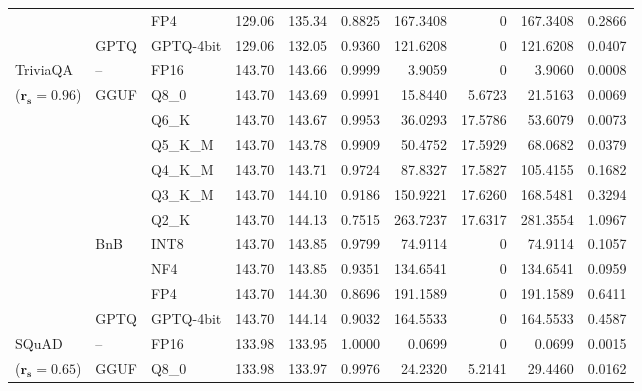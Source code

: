 \begin{longtable}{ll l rrrrrrr}
 &  & FP4 & 129.06 & 135.34 & \cellcolor{red!18} 0.8825 & \cellcolor{red!18} 167.3408 & \cellcolor{cyan!12} $0$ & \cellcolor{red!18} 167.3408 & \cellcolor{red!18} 0.2866 \\
 & GPTQ & GPTQ-4bit & 129.06 & 132.05 & \cellcolor{red!18} 0.9360 & \cellcolor{red!18} 121.6208 & \cellcolor{cyan!12} $0$ & \cellcolor{red!18} 121.6208 & \cellcolor{red!18} 0.0407 \\
\midrule
TriviaQA & -- & FP16 & 143.70 & 143.66 & 0.9999 & 3.9059 & \cellcolor{cyan!12} $0$ & 3.9060 & 0.0008 \\
{\small ($\mathbf{r_s{=}0.96}$)} & GGUF & Q8\_0 & 143.70 & 143.69 & 0.9991 & 15.8440 & 5.6723 & 21.5163 & 0.0069 \\
 &  & Q6\_K & 143.70 & 143.67 & 0.9953 & 36.0293 & 17.5786 & 53.6079 & 0.0073 \\
 &  & Q5\_K\_M & 143.70 & 143.78 & 0.9909 & 50.4752 & 17.5929 & 68.0682 & 0.0379 \\
 &  & Q4\_K\_M & 143.70 & 143.71 & 0.9724 & 87.8327 & 17.5827 & 105.4155 & 0.1682 \\
 &  & Q3\_K\_M & 143.70 & 144.10 & \cellcolor{red!18} 0.9186 & \cellcolor{red!18} 150.9221 & 17.6260 & \cellcolor{red!18} 168.5481 & \cellcolor{red!18} 0.3294 \\
 &  & Q2\_K & 143.70 & 144.13 & \cellcolor{red!35} 0.7515 & \cellcolor{red!35} 263.7237 & 17.6317 & \cellcolor{red!35} 281.3554 & \cellcolor{red!35} 1.0967 \\
 & BnB & INT8 & 143.70 & 143.85 & 0.9799 & 74.9114 & \cellcolor{cyan!12} $0$ & 74.9114 & 0.1057 \\
 &  & NF4 & 143.70 & 143.85 & \cellcolor{red!18} 0.9351 & \cellcolor{red!18} 134.6541 & \cellcolor{cyan!12} $0$ & \cellcolor{red!18} 134.6541 & \cellcolor{red!18} 0.0959 \\
 &  & FP4 & 143.70 & 144.30 & \cellcolor{red!18} 0.8696 & \cellcolor{red!18} 191.1589 & \cellcolor{cyan!12} $0$ & \cellcolor{red!18} 191.1589 & \cellcolor{red!18} 0.6411 \\
 & GPTQ & GPTQ-4bit & 143.70 & 144.14 & \cellcolor{red!18} 0.9032 & \cellcolor{red!18} 164.5533 & \cellcolor{cyan!12} $0$ & \cellcolor{red!18} 164.5533 & \cellcolor{red!18} 0.4587 \\
\midrule
SQuAD & -- & FP16 & 133.98 & 133.95 & 1.0000 & 0.0699 & \cellcolor{cyan!12} $0$ & 0.0699 & 0.0015 \\
{\small ($\mathbf{r_s{=}0.65}$)} & GGUF & Q8\_0 & 133.98 & 133.97 & 0.9976 & 24.2320 & 5.2141 & 29.4460 & 0.0162 \\

\end{longtable}
